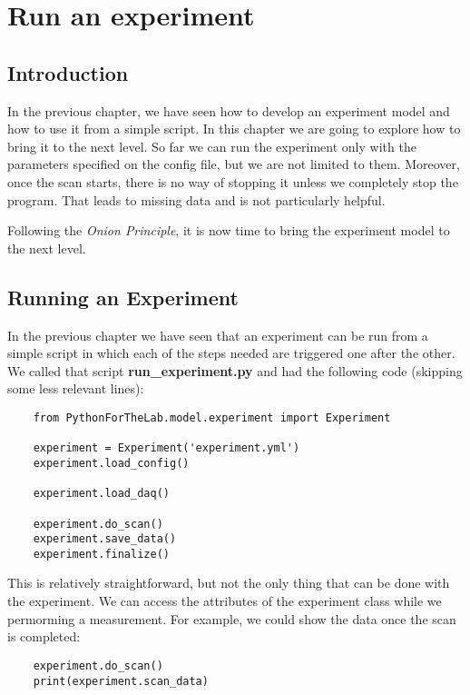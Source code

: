 \chapter{Run an experiment}\label{chapter:run-experiment}


\section{Introduction}
In the previous chapter, we have seen how to develop an experiment model and how to use it from a simple script. In this chapter we are going to explore how to bring it to the next level. So far we can run the experiment only with the parameters specified on the config file, but we are not limited to them. Moreover, once the scan starts, there is no way of stopping it unless we completely stop the program. That leads to missing data and is not particularly helpful.

Following the \emph{Onion Principle}, it is now time to bring the experiment model to the next level.


\section{Running an Experiment}\label{section:running-nexperiment}
In the previous chapter we have seen that an experiment can be run from a simple script in which each of the steps needed are triggered one after the other. We called that script \textbf{run\_experiment.py} and had the following code (skipping some less relevant lines):

\begin{verbatim}
    from PythonForTheLab.model.experiment import Experiment

    experiment = Experiment('experiment.yml')
    experiment.load_config()

    experiment.load_daq()

    experiment.do_scan()
    experiment.save_data()
    experiment.finalize()
\end{verbatim}

This is relatively straightforward, but not the only thing that can be done with the experiment. We can access the attributes of the experiment class while we permorming a measurement. For example, we could show the data once the scan is completed:

\begin{verbatim}
    experiment.do_scan()
    print(experiment.scan_data)
\end{verbatim}

